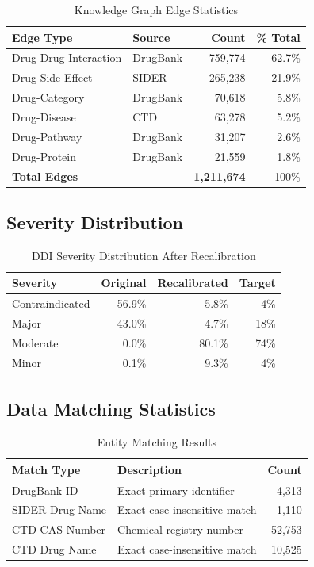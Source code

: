\documentclass[11pt,a4paper]{article}
\begin{document}
\begin{table}[h]
\centering
\caption{Knowledge Graph Edge Statistics}
\label{tab:edges}
\begin{tabular}{@{}llrr@{}}
\toprule
\textbf{Edge Type} & \textbf{Source} & \textbf{Count} & \textbf{\% Total} \\
\midrule
Drug-Drug Interaction & DrugBank & 759,774 & 62.7\% \\
Drug-Side Effect & SIDER & 265,238 & 21.9\% \\
Drug-Category & DrugBank & 70,618 & 5.8\% \\
Drug-Disease & CTD & 63,278 & 5.2\% \\
Drug-Pathway & DrugBank & 31,207 & 2.6\% \\
Drug-Protein & DrugBank & 21,559 & 1.8\% \\
\midrule
\textbf{Total Edges} & & \textbf{1,211,674} & 100\% \\
\bottomrule
\end{tabular}
\end{table}

\subsection{Severity Distribution}

\begin{table}[h]
\centering
\caption{DDI Severity Distribution After Recalibration}
\label{tab:severity}
\begin{tabular}{@{}lrrr@{}}
\toprule
\textbf{Severity} & \textbf{Original} & \textbf{Recalibrated} & \textbf{Target} \\
\midrule
Contraindicated & 56.9\% & 5.8\% & 4\% \\
Major & 43.0\% & 4.7\% & 18\% \\
Moderate & 0.0\% & 80.1\% & 74\% \\
Minor & 0.1\% & 9.3\% & 4\% \\
\bottomrule
\end{tabular}
\end{table}

\subsection{Data Matching Statistics}

\begin{table}[h]
\centering
\caption{Entity Matching Results}
\label{tab:matching}
\begin{tabular}{@{}llr@{}}
\toprule
\textbf{Match Type} & \textbf{Description} & \textbf{Count} \\
\midrule
DrugBank ID & Exact primary identifier & 4,313 \\
SIDER Drug Name & Exact case-insensitive match & 1,110 \\
CTD CAS Number & Chemical registry number & 52,753 \\
CTD Drug Name & Exact case-insensitive match & 10,525 \\
\bottomrule
\end{tabular}
\end{table}
\end{document}
